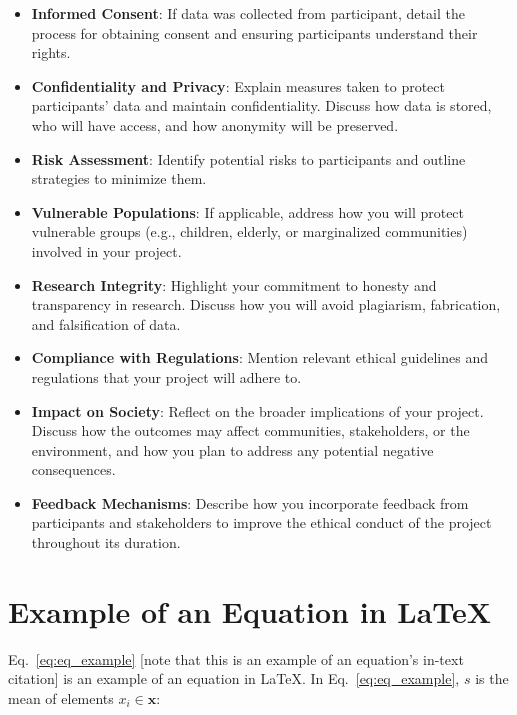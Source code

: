 \begin{itemize}
  \item \textbf{Informed Consent}: If data was collected from
    participant, detail the process for obtaining consent and
    ensuring participants understand their rights.

  \item \textbf{Confidentiality and Privacy}: Explain measures taken
    to protect participants' data and maintain confidentiality.
    Discuss how data is stored, who will have access, and how
    anonymity will be preserved.

  \item \textbf{Risk Assessment}: Identify potential risks to
    participants and outline strategies to minimize them.

  \item \textbf{Vulnerable Populations}: If applicable, address how
    you will protect vulnerable groups (e.g., children, elderly, or
    marginalized communities) involved in your project.

  \item \textbf{Research Integrity}: Highlight your commitment to
    honesty and transparency in research. Discuss how you will avoid
    plagiarism, fabrication, and falsification of data.

  \item \textbf{Compliance with Regulations}: Mention relevant
    ethical guidelines and regulations that your project will adhere to.

  \item \textbf{Impact on Society}: Reflect on the broader
    implications of your project. Discuss how the outcomes may affect
    communities, stakeholders, or the environment, and how you plan
    to address any potential negative consequences.

  \item \textbf{Feedback Mechanisms}: Describe how you incorporate
    feedback from participants and stakeholders to improve the
    ethical conduct of the project throughout its duration.

\end{itemize}

\section{Example of an Equation in \LaTeX}
Eq.~\ref{eq:eq_example} [note that this is an example of an
equation's in-text citation] is an example of an equation in \LaTeX.
In Eq.~\eqref{eq:eq_example}, $ s $ is the mean of elements $ x_i \in
\mathbf{x} $:

